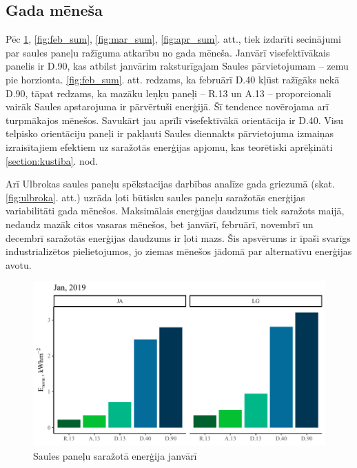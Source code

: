 
\subsection{Gada mēneša} \label{subsection:gads}
Pēc \ref{fig:jan_sum}, \ref{fig:feb_sum}, \ref{fig:mar_sum}, \ref{fig:apr_sum}. att., tiek izdarīti secinājumi par saules paneļu ražīguma atkarību no gada mēneša. Janvārī visefektīvākais panelis ir D.90, kas atbilst janvārim raksturīgajam Saules pārvietojumam -- zemu pie horzionta. \ref{fig:feb_sum}. att. redzams, ka februārī D.40 kļūst ražīgāks nekā D.90, tāpat redzams, ka mazāku leņķu paneļi -- R.13 un A.13 -- proporcionali vairāk Saules apstarojuma ir pārvērtuši enerģijā. Šī tendence novērojama arī turpmākajos mēnešos. Savukārt jau aprīlī visefektīvākā orientācija ir D.40. Visu telpisko orientāciju paneļi ir pakļauti Saules diennakts pārvietojuma izmaiņas izraisītajiem efektiem uz saražotās enerģijas apjomu, kas teorētiski aprēķināti \ref{section:kustiba}. nod.


Arī Ulbrokas saules paneļu spēkstacijas darbības analīze gada griezumā (skat. \ref{fig:ulbroka}. att.) uzrāda ļoti būtisku saules paneļu saražotās enerģijas variabilitāti gada mēnešos. Maksimālais enerģijas daudzums tiek saražots maijā, nedaudz mazāk citos vasaras mēnešos, bet janvārī, februārī, novembrī un decembrī saražotās enerģijas daudzums ir ļoti mazs. Šis apsvērums ir īpaši svarīgs industrializētos pielietojumos, jo ziemas mēnešos jādomā par alternatīvu enerģijas avotu.

\begin{figure}[h]
    \centering
    \includegraphics[width=\linewidth]{figures/sol_month/jan_m_m2.pdf}
    \caption{Saules paneļu saražotā enerģija janvārī}
    \label{fig:jan_sum}
\end{figure}

